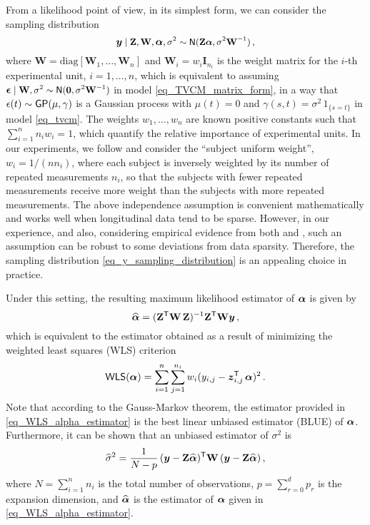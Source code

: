 \documentclass[letterpaper,10pt,openany]{article}
\def\frac#1#2{{{#1}\over{#2}}}
\newcommand{\diag}[1]{\text{diag}\left[#1\right]}
\def\I{\mathbf{I}}\def\i{\mathbf{i}}\def\Iv{\boldsymbol{I}}\def\iv{\boldsymbol{i}}
\def\W{\mathbf{W}}\def\w{\mathbf{w}}\def\Wv{\boldsymbol{W}}\def\wv{\boldsymbol{w}}
\def\Z{\mathbf{Z}}\def\z{\mathbf{z}}\def\Zv{\boldsymbol{Z}}\def\zv{\boldsymbol{z}}
\def\eps{\epsilon}\def\epsv{\boldsymbol{\epsilon}}
\def\sig{\sigma}\def\sigv{\boldsymbol{\sigma}}
\def\epsv{\boldsymbol{\eps}}
\def\alphav{\boldsymbol{\alpha}}
\def\Nor{\small{\mathsf{N}}}
\def\trans{\text{\textsf{T}}}
\def\zerov{\boldsymbol{0}}
\begin{document}
{\color{black}
From a likelihood point of view, in its simplest form, we can consider the sampling distribution
\begin{equation}\label{eq_y_sampling_distribution}
\yv  \mid \Z,\W,\alv,\sig^2 \sim \Nor(\Z\alv,\sig^2\W^{-1})\,,
\end{equation}
where $\W=\diag{\W_1,\ldots,\W_n}$ and $\W_i = w_i\I_{n_i}$ is the weight matrix for the $i$-th experimental unit, $i = 1,\ldots,n$, which is equivalent to assuming $\epsv\mid\W,\sig^2\sim\Nor(\zerov,\sig^2\W^{-1})$ in model \eqref{eq_TVCM_matrix_form}, in a way that $\eps(t) \sim \text{\textsf{GP}}(\mu, \gamma)$ is a Gaussian process with $\mu(t)=0$ and $\gamma(s,t) = \sigma^2\, 1_{\{ s = t\}}$ in model \eqref{eq_tvcm}.  The weights $w_1,\ldots,w_n$ are known positive constants such that $\sum_{i=1}^n n_i w_i = 1$, which quantify the relative importance of experimental units. In our experiments, we follow \cite{wu-tian-2018} and consider the ``subject uniform weight'', $w_i =1/(nn_i)$, where each subject is inversely weighted by its number of repeated measurements $n_i$, so that the subjects with fewer repeated measurements receive more weight than the subjects with more repeated measurements.  The above independence assumption is convenient mathematically and works well when longitudinal data tend to be sparse.  However, in our experience, and also, considering empirical evidence from both \cite{wu-zhang-06} and \cite{wu-tian-2018}, such an assumption can be robust to some deviations from data sparsity. Therefore, the sampling distribution \eqref{eq_y_sampling_distribution} is an appealing choice in practice.


Under this setting, the resulting maximum likelihood estimator of $\boldsymbol{\alpha}$ is given by
\begin{equation}\label{eq_WLS_alpha_estimator}
\widehat\alv = (\Z^\trans\W\,\Z)^{-1}\Z^\trans\W\yv\,,
\end{equation}
which is equivalent to the estimator obtained as a result of minimizing the weighted least squares (\textsf{WLS}) criterion
\begin{equation}\label{objective_function_WLS}
\textsf{WLS}(\alphav) = \sum_{i=1}^{n}\sum_{j=1}^{n_i}w_i (y_{i,j} - \zv_{i,j}^\trans\,\alphav)^2\,.
\end{equation}
Note that according to the Gauss-Markov theorem, the estimator provided in \eqref{eq_WLS_alpha_estimator} is the best linear unbiased estimator (BLUE) of $\boldsymbol{\alpha}$. Furthermore, it can be shown that an unbiased estimator of $\sig^2$ is
\begin{equation}\label{eq_sig2_estimator}
\widehat\sig^2 = \frac{1}{N-p}\, (\yv - \Z\widehat\alv)^\trans\W\, (\yv - \Z\widehat\alv)\,,
\end{equation}
where $N = \sum_{i=1}^n n_i$ is the total number of observations, $p=\sum_{r=0}^d p_r$ is the expansion dimension, and $\widehat{\boldsymbol{\alpha}}$ is the estimator of $\boldsymbol{\alpha}$ given in \eqref{eq_WLS_alpha_estimator}.
}
\end{document}
